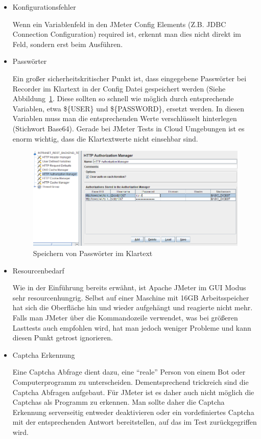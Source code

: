 \documentclass[a4paper,12pt]{article}
\begin{document}
\begin{itemize}
	\item Konfigurationsfehler
	
	Wenn ein Variablenfeld in den JMeter Config Elements (Z.B. JDBC Connection Configuration) required ist, erkennt man dies nicht direkt im Feld, sondern erst beim Ausführen.
	
	\item Passwörter
	
	Ein großer sicherheitskritischer Punkt ist, dass eingegebene Passwörter bei Recorder im Klartext in der Config Datei gespeichert werden (Siehe Abbildung~\ref{fig:password}. Diese sollten so schnell wie möglich durch entsprechende Variablen, etwa \$\{USER\} und \$\{PASSWORD\}, ersetzt werden. In diesen Variablen muss man die entsprechenden Werte verschlüsselt hinterlegen (Stichwort Base64).
Gerade bei JMeter Tests in Cloud Umgebungen ist es enorm wichtig, dass die Klartextwerte nicht einsehbar sind.  

	\begin{figure}[htb]%
 \centering
    \includegraphics[width=1\textwidth]{bilder/password.png}
  \caption{Speichern von Passwörter im Klartext}
  \label{fig:password}
\end{figure}

	\item Resourcenbedarf
	
	Wie in der Einführung bereits erwähnt, ist Apache JMeter im GUI Modus sehr resourcenhungrig. Selbst auf einer Maschine mit 16GB Arbeitsspeicher hat sich die Oberfläche hin und wieder aufgehängt und reagierte nicht mehr. Falls man JMeter über die Kommandozeile verwendet, was bei größeren Lasttests auch empfohlen wird, hat man jedoch weniger Probleme und kann diesen Punkt getrost ignorieren.

\item Captcha Erkennung

Eine Captcha Abfrage dient dazu, eine "`reale"' Person von einem Bot oder Computerprogramm zu unterscheiden. Dementsprechend trickreich sind die Captcha Abfragen aufgebaut. Für JMeter ist es daher auch nicht möglich die Captchas als Programm zu erkennen. Man sollte daher die Captcha Erkennung serverseitig entweder deaktivieren oder ein vordefiniertes Captcha mit der entsprechenden Antwort bereitstellen, auf das im Test zurückgegriffen wird.

\end{itemize}
\end{document}
